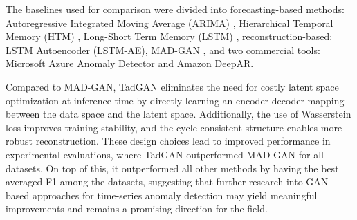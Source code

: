 The baselines used for comparison were divided into forecasting-based methods: Autoregressive Integrated Moving Average (ARIMA) \cite{pena2013arima-ad}, Hierarchical Temporal Memory (HTM) \cite{ahmad2017htm}, Long-Short Term Memory (LSTM) \cite{hundman2018detecting}, reconstruction-based: LSTM Autoencoder (LSTM-AE), MAD-GAN \cite{li2019madgan}, and two commercial tools: Microsoft Azure Anomaly Detector and Amazon DeepAR. 

Compared to MAD-GAN, TadGAN eliminates the need for costly latent space optimization at inference time by directly learning an encoder-decoder mapping between the data space and the latent space. Additionally, the use of Wasserstein loss improves training stability, and the cycle-consistent structure enables more robust reconstruction. These design choices lead to improved performance in experimental evaluations, where TadGAN outperformed MAD-GAN for all datasets. On top of this, it outperformed all other methods by having the best averaged F1 among the datasets, suggesting that further research into GAN-based approaches for time-series anomaly detection may yield meaningful improvements and remains a promising direction for the field.
